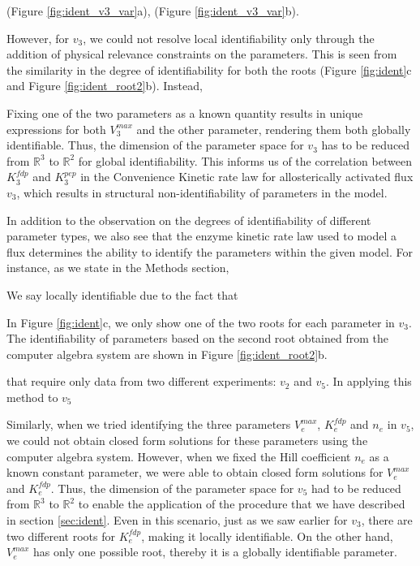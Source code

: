 \documentclass[10pt]{article}
\begin{document}
	
	(Figure \ref{fig:ident_v3_var}a),  (Figure \ref{fig:ident_v3_var}b).
	
	However, for $v_3$, we could not resolve local identifiability only through the addition of physical relevance constraints on the parameters. This is seen from the similarity in the degree of identifiability for both the roots (Figure \ref{fig:ident}c and Figure \ref{fig:ident_root2}b). Instead, 
	
	 Fixing one of the two parameters as a known quantity results in unique expressions for both $V_3^{max}$ and the other parameter, rendering them both globally identifiable. Thus, the dimension of the parameter space for $v_3$ has to be reduced from $\mathbb{R}^3$ to $\mathbb{R}^2$ for global identifiability. This informs us of the correlation between $K_3^{fdp}$ and $K_3^{pep}$ in the Convenience Kinetic rate law for allosterically activated flux $v_3$, which results in structural non-identifiability of parameters in the model.
	
	In addition to the observation on the degrees of identifiability of different parameter types, we also see that the enzyme kinetic rate law used to model a flux determines the ability to identify the parameters within the given model. For instance, as we state in the Methods section, 
	
	 We say locally identifiable due to the fact that  
	 
	 In Figure \ref{fig:ident}c, we only show one of the two roots for each parameter in $v_3$. The identifiability of parameters based on the second root obtained from the computer algebra system are shown in Figure \ref{fig:ident_root2}b. 
	
	 that require only data from two different experiments: $v_2$ and $v_5$. In applying this method to $v_5$
	 
		Similarly, when we tried identifying the three parameters $V_e^{max}$, $K_e^{fdp}$ and $n_e$ in $v_5$, we could not obtain closed form solutions for these parameters using the computer algebra system. However, when we fixed the Hill coefficient $n_e$ as a known constant parameter, we were able to obtain closed form solutions for $V_e^{max}$ and $K_e^{fdp}$. Thus, the dimension of the parameter space for $v_5$ had to be reduced from $\mathbb{R}^3$ to $\mathbb{R}^2$ to enable the application of the procedure that we have described in section \ref{sec:ident}. Even in this scenario, just as we saw earlier for $v_3$, there are two different roots for $K_e^{fdp}$, making it locally identifiable. On the other hand, $V_e^{max}$ has only one possible root, thereby it is a globally identifiable parameter. 
	
\end{document}
